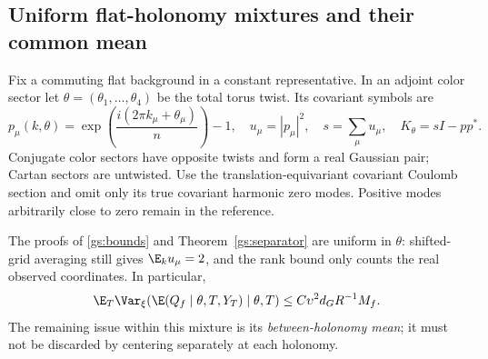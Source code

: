 \subsection{Uniform flat-holonomy mixtures and their common mean}

Fix a commuting flat background in a constant representative. In an adjoint
color sector let \(\theta=(\theta_1,\ldots,\theta_4)\) be the total torus twist.
Its covariant symbols are
\[
 p_\mu(k,\theta)=\exp\!\left(\frac{i(2\pi k_\mu+\theta_\mu)}n\right)-1,
 \quad u_\mu=|p_\mu|^2,\quad s=\sum_\mu u_\mu,
 \quad K_\theta=sI-pp^*.
\]
Conjugate color sectors have opposite twists and form a real Gaussian pair;
Cartan sectors are untwisted. Use the translation-equivariant covariant Coulomb
section and omit only its true covariant harmonic zero modes. Positive modes
arbitrarily close to zero remain in the reference.

The proofs of \eqref{gs:bounds} and Theorem~\ref{gs:separator} are uniform
in \(\theta\): shifted-grid averaging still gives \(\E_k u_\mu=2\), and the
rank bound only counts the real observed coordinates. In particular,
\begin{equation}
 \E_T\Var_\xi\!\left(\E(Q_f\mid\theta,T,Y_T)\mid\theta,T\right)
 \le C\upsilon^2d_GR^{-1}M_f.
 \label{gs:twistedconditional}
\end{equation}
The remaining issue within this mixture is its \emph{between-holonomy mean};
it must not be discarded by centering separately at each holonomy.

